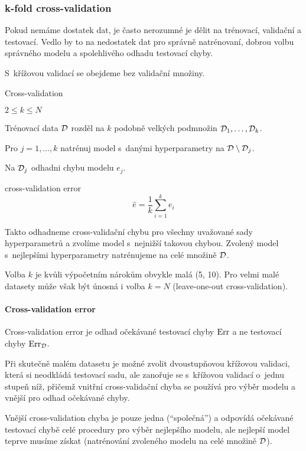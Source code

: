 \subsubsection{k-fold cross-validation}

Pokud nemáme dostatek dat, je často nerozumné je dělit na trénovací, validační a testovací. Vedlo by to na nedostatek dat pro správně natrénovaní, dobrou volbu správného modelu a spolehlivého odhadu testovací chyby.

S~křížovou validací se obejdeme bez validační množiny.
\begin{algorithm}[H]
    \renewcommand{\thealgorithm}{}
    \caption{Cross-validation}
    \begin{algorithmic}[1]
        \Require $2 \le k \le N$
        \item Trénovací data $\mathcal{D}$ rozděl na $k$ podobně velkých podmnožin $\mathcal{D}_1, \ldots, \mathcal{D}_k$.
        \item Pro $j = 1, \ldots, k$ natrénuj model s~danými hyperparametry na $\mathcal{D} \setminus \mathcal{D}_j$.
        \item Na $\mathcal{D}_j$ odhadni chybu modelu $e_j$.
        \item \Return cross-validation error
        \[\hat{e} = \frac{1}{k} \sum_{i=1}^{k} e_i\]
    \end{algorithmic}
\end{algorithm}

Takto odhadneme cross-validační chybu pro všechny uvažované sady hyperparametrů a zvolíme model s~nejnižší takovou chybou. Zvolený model s~nejlepšími hyperparametry natrénujeme na celé množině $\mathcal{D}$.

Volba $k$ je kvůli výpočetním nárokům obvykle malá (5, 10). Pro velmi malé datasety může však být únosná i volba $k=N$ (leave-one-out cross-validation).

\paragraph{Cross-validation error} Cross-validation error je odhad očekávané testovací chyby $\text{Err}$ a ne testovací chyby $\text{Err}_{\mathcal{D}}$.

Při skutečně malém datasetu je možné zvolit dvoustupňovou křížovou validaci, která si neodkládá testovací sadu, ale zanořuje se s~křížovou validací o~jednu stupeň níž, přičemž vnitřní cross-validační chyba se používá pro výběr modelu a vnější pro odhad očekávané chyby.

Vnější cross-validation chyba je pouze jedna (``společná'') a odpovídá očekávané testovací chybě celé procedury pro výběr nejlepšího
modelu, ale nejlepší model teprve musíme získat (natrénování zvoleného modelu na celé množině $\mathcal{D}$).

